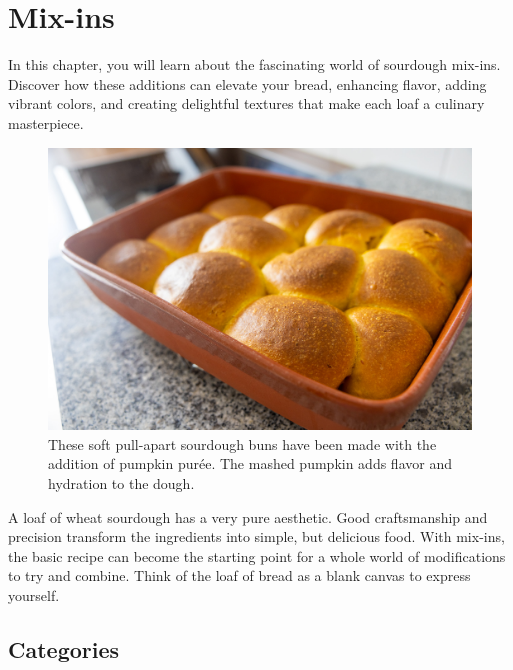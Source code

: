 \chapter{Mix-ins}%
\label{ch:mix-ins}
\begin{quoting}
  In this chapter, you will learn about the fascinating world of sourdough
  mix-ins. Discover how these additions can elevate your bread, enhancing
  flavor, adding vibrant colors, and creating delightful textures that make
  each loaf a culinary masterpiece.
\end{quoting}

\begin{figure}[htb!]
  \centering
  \includegraphics[width=\textwidth]{pumpkin-sourdough}
  \caption[Pumpkin sourdough softbuns]{These soft pull-apart sourdough
    buns have been made with the addition of pumpkin purée. The mashed pumpkin
    adds flavor and hydration to the dough.}%
\end{figure}

A loaf of wheat sourdough has a very pure aesthetic. Good craftsmanship and
precision transform the ingredients into simple, but delicious food. With
mix-ins, the basic recipe can become the starting point for a whole world of
modifications to try and combine. Think of the loaf of bread as a blank canvas
to express yourself.

\section{Categories}

